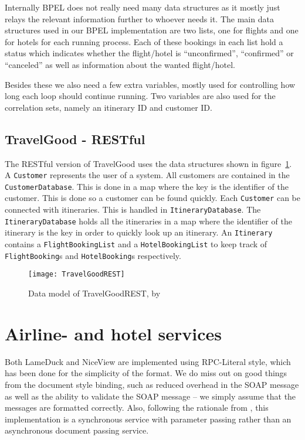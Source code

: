 \noindent
Internally BPEL does not really need many data structures as it mostly just relays the relevant information further to whoever needs it. The main data structures used in our BPEL implementation are two lists, one for flights and one for hotels for each running process. Each of these bookings in each list hold a status which indicates whether the flight/hotel is ``unconfirmed'', ``confirmed'' or ``canceled'' as well as information about the wanted flight/hotel.

Besides these we also need a few extra variables, mostly used for controlling how long each loop should continue running. Two variables are also used for the correlation sets, namely an itinerary ID and customer ID.

\subsection{TravelGood - RESTful}
\mrb

\noindent
The RESTful version of TravelGood uses the data structures shown in figure~\ref{fig:rest_class}. A \texttt{Customer} represents the user of a system. All customers are contained in the \texttt{Customer\-Database}. This is done in a map where the key is the identifier of the customer. This is done so a customer can be found quickly. Each \texttt{Customer} can be connected with itineraries. This is handled in \texttt{ItineraryDatabase}. The \texttt{ItineraryDatabase} holds all the itineraries in a map where the identifier of the itinerary is the key in order to quickly look up an itinerary. An \texttt{Itinerary} contains a \texttt{FlightBookingList} and a \texttt{HotelBookingList} to keep track of \texttt{FlightBooking}s and \texttt{HotelBooking}s respectively.

\begin{figure}[H]
\centering
\texttt{[image: TravelGoodREST]}
\caption{Data model of TravelGoodREST, by \mkt{}}
\label{fig:rest_class}
\end{figure}


\section{Airline- and hotel services}
\kim{}

\noindent
Both LameDuck and NiceView are implemented using RPC-Literal style, which has been done for the simplicity of the format. We do miss out on good things from the document style binding, such as reduced overhead in the SOAP message as well as the ability to validate the SOAP message -- we simply assume that the messages are formatted correctly. 
Also, following the rationale from \cite{papazoglou2008web}, this implementation is a synchronous service with parameter passing rather than an asynchronous document passing service.

